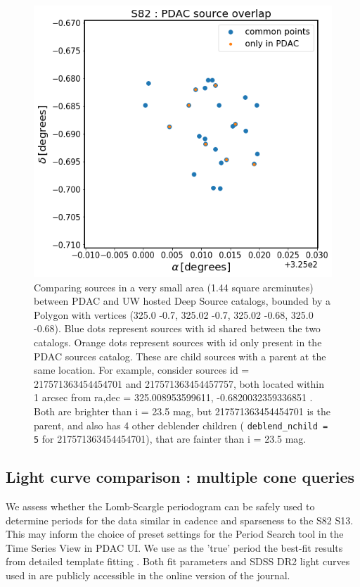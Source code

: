 \documentclass[DM,lsstdraft,toc,usenatbib]{lsstdoc}
\begin{document}
\begin{figure}
\includegraphics[width=\textwidth]{figs/Box_compare_sources}
\cprotect\caption{Comparing sources in a very small area (1.44 square arcminutes) between PDAC and UW hosted Deep Source catalogs, bounded by a Polygon with vertices (325.0  -0.7,  325.02  -0.7, 325.02  -0.68, 325.0   -0.68).  Blue dots represent sources with id shared between the two catalogs. Orange dots represent sources with id only present in the PDAC sources catalog. These are child sources with a parent at the same location. For example, consider sources id = 217571363454454701 and 217571363454457757, both located within 1 arcsec from ra,dec = 325.008953599611, -0.6820032359336851 . Both are brighter than i = 23.5 mag, but 217571363454454701 is the parent, and also has 4 other deblender children ( \verb|deblend_nchild = 5| for 217571363454454701), that are fainter than i = 23.5 mag.}
\label{fig:box_deblended_sources}
\end{figure}



\subsection{Light curve comparison : multiple cone queries }
\label{sec:rr_lyrae}



We assess whether the Lomb-Scargle periodogram can be safely used to determine periods for the data similar in cadence and sparseness to the  S82 S13. This may inform the choice of  preset settings for the Period Search tool in the Time Series View in PDAC UI. 
We use as the 'true' period the best-fit results from detailed template fitting \cite{sesar2010} . Both fit parameters and  SDSS DR2 light curves used in \cite{sesar2010}  are publicly accessible in the online version of the journal. 
\end{document}
